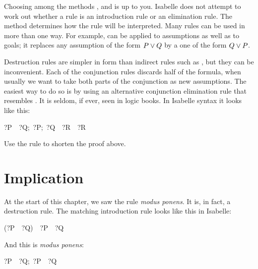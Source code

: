 Choosing among the methods ,  and  is up to 
you.  Isabelle does not attempt to work out whether a rule 
is an introduction rule or an elimination rule.  The 
method determines how the rule will be interpreted. Many rules 
can be used in more than one way.  For example,  can 
be applied to assumptions as well as to goals; it replaces any
assumption of the form
$P\vee Q$ by a one of the form $Q\vee P$.

Destruction rules are simpler in form than indirect rules such as ,
but they can be inconvenient.  Each of the conjunction rules discards half 
of the formula, when usually we want to take both parts of the conjunction as new
assumptions.  The easiest way to do so is by using an 
alternative conjunction elimination rule that resembles \@.  It is
seldom, if ever, seen in logic books.  In Isabelle syntax it looks like this: 
\begin{isabelle}
\isasymlbrakk?P\ \isasymand\ ?Q;\ \isasymlbrakk?P;\ ?Q\isasymrbrakk\ \isasymLongrightarrow\ ?R\isasymrbrakk\ \isasymLongrightarrow\ ?R
\end{isabelle}

\begin{exercise}
Use the rule  to shorten the proof above. 
\end{exercise}


\section{Implication}

%
At the start of this chapter, we saw the rule \emph{modus ponens}.  It is, in fact,
a destruction rule. The matching introduction rule looks like this 
in Isabelle: 
\begin{isabelle}
(?P\ \isasymLongrightarrow\ ?Q)\ \isasymLongrightarrow\ ?P\
\isasymlongrightarrow\ ?Q
\end{isabelle}
And this is \emph{modus ponens}:
\begin{isabelle}
\isasymlbrakk?P\ \isasymlongrightarrow\ ?Q;\ ?P\isasymrbrakk\
\isasymLongrightarrow\ ?Q
\rulenamedx{mp}
\end{isabelle}

